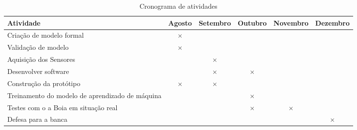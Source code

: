 \label{chapter:consideracoes}

\begin{table}[htbp]
  \centering
  \caption{Cronograma de atividades}
  \label{tab:cronograma}
  \begin{tabularx}{\textwidth}{|X|c|c|c|c|c|}
    \hline
    \textbf{Atividade} & \textbf{Agosto} & \textbf{Setembro} & \textbf{Outubro} & \textbf{Novembro} & \textbf{Dezembro} \\
    \hline
    Criação de modelo formal & \(\times\) & & & & \\
    \hline
    Validação de modelo & \(\times\) &  &  & & \\
    \hline
    Aquisição dos Sensores & & \(\times\)  &  & & \\
    \hline
    Desenvolver software & & \(\times\)  & \(\times\) & & \\
    \hline
    Construção da protótipo & \(\times\) & \(\times\)  &  & & \\
   \hline
    Treinamento do modelo de aprendizado de máquina & & & \(\times\) & &  \\
    \hline
    Testes com o a Boia em situação real & & & \(\times\) & \(\times\) &  \\
    \hline
    Defesa para a banca & & & & & \(\times\)  \\
    \hline
  \end{tabularx}
\end{table}